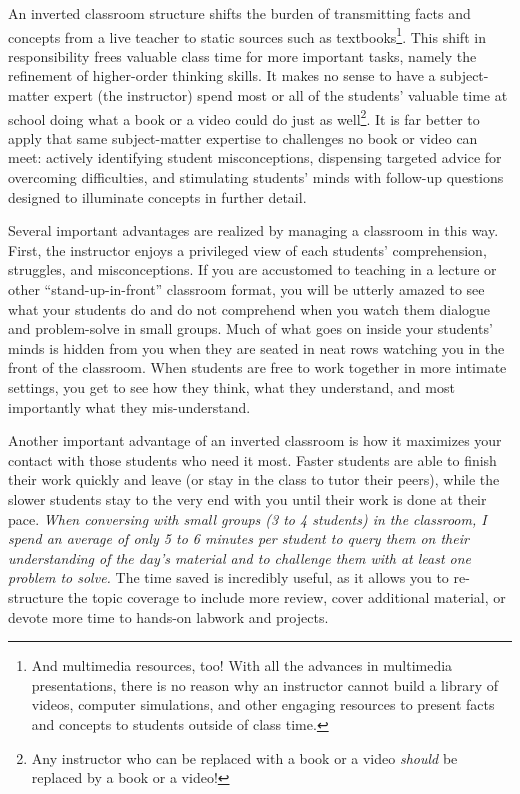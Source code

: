An inverted classroom structure shifts the burden of transmitting facts and concepts from a live teacher to static sources such as textbooks\footnote{And multimedia resources, too!  With all the advances in multimedia presentations, there is no reason why an instructor cannot build a library of videos, computer simulations, and other engaging resources to present facts and concepts to students outside of class time.}.  This shift in responsibility frees valuable class time for more important tasks, namely the refinement of higher-order thinking skills.  It makes no sense to have a subject-matter expert (the instructor) spend most or all of the students' valuable time at school doing what a book or a video could do just as well\footnote{Any instructor who can be replaced with a book or a video \textit{should} be replaced by a book or a video!}.  It is far better to apply that same subject-matter expertise to challenges no book or video can meet: actively identifying student misconceptions, dispensing targeted advice for overcoming difficulties, and stimulating students' minds with follow-up questions designed to illuminate concepts in further detail.

Several important advantages are realized by managing a classroom in this way.  First, the instructor enjoys a privileged view of each students' comprehension, struggles, and misconceptions.  If you are accustomed to teaching in a lecture or other ``stand-up-in-front'' classroom format, you will be utterly amazed to see what your students do and do not comprehend when you watch them dialogue and problem-solve in small groups.  Much of what goes on inside your students' minds is hidden from you when they are seated in neat rows watching you in the front of the classroom.  When students are free to work together in more intimate settings, you get to see how they think, what they understand, and most importantly what they mis-understand.  

Another important advantage of an inverted classroom is how it maximizes your contact with those students who need it most.  Faster students are able to finish their work quickly and leave (or stay in the class to tutor their peers), while the slower students stay to the very end with you until their work is done at their pace.  \textit{When conversing with small groups (3 to 4 students) in the classroom, I spend an average of only 5 to 6 minutes per student to query them on their understanding of the day's material and to challenge them with at least one problem to solve.}  The time saved is incredibly useful, as it allows you to re-structure the topic coverage to include more review, cover additional material, or devote more time to hands-on labwork and projects.

